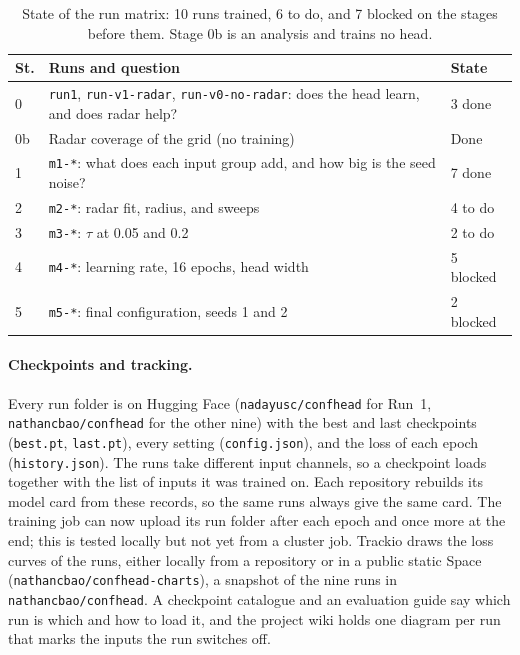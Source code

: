 \begin{table}[t]
  \centering
  \small
  \setlength{\tabcolsep}{4pt}
  \begin{tabular}{@{}l >{\raggedright\arraybackslash}p{4.35cm} l@{}}
    \toprule
    \textbf{St.} & \textbf{Runs and question} & \textbf{State} \\
    \midrule
    0 & \texttt{run1}, \texttt{run-v1-radar}, \texttt{run-v0-no-radar}: does the head learn, and does radar help? & 3 done \\
    0b & Radar coverage of the grid (no training) & Done \\
    1 & \texttt{m1-*}: what does each input group add, and how big is the seed noise? & 7 done \\
    2 & \texttt{m2-*}: radar fit, radius, and sweeps & 4 to do \\
    3 & \texttt{m3-*}: $\tau$ at 0.05 and 0.2 & 2 to do \\
    4 & \texttt{m4-*}: learning rate, 16 epochs, head width & 5 blocked \\
    5 & \texttt{m5-*}: final configuration, seeds 1 and 2 & 2 blocked \\
    \bottomrule
  \end{tabular}
  \caption{State of the run matrix: 10 runs trained, 6 to do, and 7 blocked on the stages before them. Stage 0b is an analysis and trains no head.}
  \label{tab:stages}
\end{table}

\paragraph{Checkpoints and tracking.} Every run folder is on Hugging Face (\texttt{nadayusc/confhead} for Run~1, \texttt{nathancbao/confhead} for the other nine) with the best and last checkpoints (\texttt{best.pt}, \texttt{last.pt}), every setting (\texttt{config.json}), and the loss of each epoch (\texttt{history.json}). The runs take different input channels, so a checkpoint loads together with the list of inputs it was trained on. Each repository rebuilds its model card from these records, so the same runs always give the same card. The training job can now upload its run folder after each epoch and once more at the end; this is tested locally but not yet from a cluster job. Trackio draws the loss curves of the runs, either locally from a repository or in a public static Space (\texttt{nathancbao/confhead-charts}), a snapshot of the nine runs in \texttt{nathancbao/confhead}. A checkpoint catalogue and an evaluation guide say which run is which and how to load it, and the project wiki holds one diagram per run that marks the inputs the run switches off.


